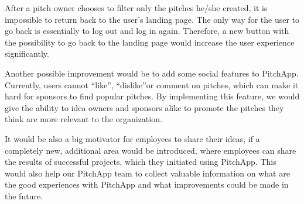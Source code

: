 After a pitch owner chooses to filter only the pitches he/she created, it is impossible to return back to the user’s landing page. The only way for the user to go back is essentially to log out and log in again. Therefore, a new button with the possibility to go back to the landing page would increase the user experience significantly.

Another possible improvement would be to add some social features to PitchApp. Currently, users cannot “like”, “dislike”or comment on pitches, which can make it hard for sponsors to find popular pitches. By implementing this feature, we would give the ability to idea owners and sponsors alike to promote the pitches they think are more relevant to the organization.

It would be also a big motivator for employees to share their ideas, if a completely new, additional area would be introduced, where employees can share the results of successful projects, which they initiated using PitchApp. This would also help our PitchApp team to collect valuable information on what are the good experiences with PitchApp and what improvements could be made in the future.
